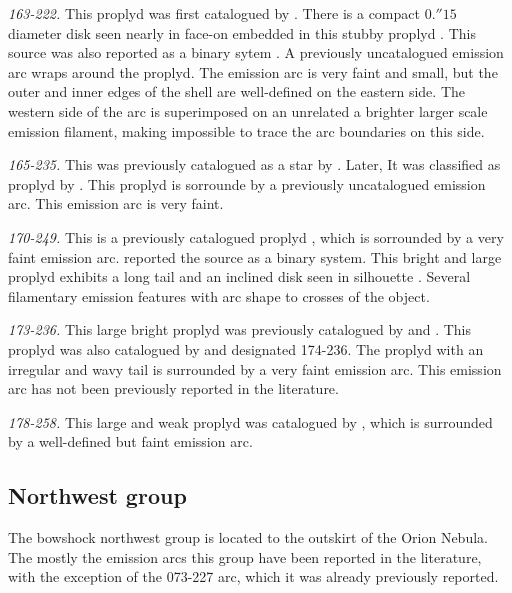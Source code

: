 \documentclass[iop, apj]{emulateapj}
\renewcommand\clearpage{}
\begin{document}
\textit{163-222.} This proplyd was first catalogued by
\citet{ODell:1996a}. There is a compact \(0.''15\) diameter disk seen
nearly in face-on embedded  in this stubby  proplyd
\citep{Bally:2000a, Ricci:2008a}.  This source was also reported as a
binary sytem \citep{Ricci:2008a}. A previously uncatalogued emission
arc wraps around the proplyd. The emission arc is very faint and
small, but the outer and inner edges of the shell are well-defined on the eastern side. The western side of the arc is superimposed on an unrelated a brighter larger scale emission filament, making impossible to trace the arc boundaries on this side.

\textit{165-235.} This was previously catalogued as a star by \citet{ODell:1996a}. Later, It was classified as proplyd by \citet{Ricci:2008a}. This proplyd is sorrounde by a previously uncatalogued emission arc. This emission arc is very faint.

\textit{170-249.} This is a previously catalogued proplyd \citet{ODell:1996a, Ricci:2008a}, which is sorrounded by a very faint emission arc. \citet{Ricci:2008a} reported the source as a binary system.  This bright and large proplyd exhibits a long tail and an inclined disk seen in silhouette \citep{Bally:2000a}. Several  filamentary emission features with arc shape to crosses of the object. 

\textit{173-236.} This large bright proplyd was previously catalogued by \citet{ODell:1996a} and \citet{Ricci:2008a}. This proplyd was also catalogued by \citet{Bally:2000a} and designated 174-236. The proplyd with an irregular and wavy tail \citep[see][]{Bally:2000a} is surrounded by a very faint  emission arc. This emission arc has not been previously reported in the literature.   

\textit{178-258.}  This large and weak proplyd was catalogued by \citet{Ricci:2008a}, which is surrounded by a well-defined but faint emission arc.

\clearpage
\subsection{Northwest group}
\label{sec:nw-group}



The bowshock northwest group is located to the outskirt of the Orion Nebula. The mostly the emission arcs this group have been reported in the literature, with the exception of the  073-227 arc, which it was already previously reported.    
\end{document}
